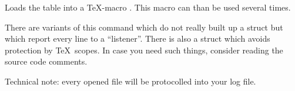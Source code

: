 \begin{command}{\pgfplotstableread{}}
	Loads the table  into a \TeX-macro . This macro can than be used several times.
\begin{codeexample}[]
\table
\pgfplotstabletypeset[columns={dof,error1}]\table
\hspace{2cm}
\pgfplotstabletypeset[columns={dof,error2}]\table
\end{codeexample}
	There are variants of this command which do not really built up a struct but which report every line to a ``listener''. There is also a struct which avoids protection by \TeX\ scopes. In case you need such things, consider reading the source code comments.

Technical note: every opened file will be protocolled into your log file.
\end{command}

